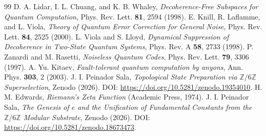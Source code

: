 \documentclass[aps,pra,twocolumn,10pt,superscriptaddress]{revtex4-2}
\newcommand{\Zmod}{\mathbb{Z}/6\mathbb{Z}}
\begin{document}
\begin{thebibliography}{99}
 D. A. Lidar, I. L. Chuang, and K. B. Whaley, \textit{Decoherence-Free Subspaces for Quantum Computation}, Phys. Rev. Lett. \textbf{81}, 2594 (1998).
 E. Knill, R. Laflamme, and L. Viola, \textit{Theory of Quantum Error Correction for General Noise}, Phys. Rev. Lett. \textbf{84}, 2525 (2000).
 L. Viola and S. Lloyd, \textit{Dynamical Suppression of Decoherence in Two-State Quantum Systems}, Phys. Rev. A \textbf{58}, 2733 (1998).
 P. Zanardi and M. Rasetti, \textit{Noiseless Quantum Codes}, Phys. Rev. Lett. \textbf{79}, 3306 (1997).
 A. Yu. Kitaev, \textit{Fault-tolerant quantum computation by anyons}, Ann. Phys. \textbf{303}, 2 (2003).
 J. I. Peinador Sala, \textit{Topological State Preparation via $\Zmod$ Superselection}, Zenodo (2026). DOI: \url{https://doi.org/10.5281/zenodo.19354010}.
 H. M. Edwards, \textit{Riemann's Zeta Function} (Academic Press, 1974).
 J. I. Peinador Sala, \textit{The Genesis of $e$ and the Unification of Fundamental Constants from the $\Zmod$ Modular Substrate}, Zenodo (2026). DOI: \url{https://doi.org/10.5281/zenodo.18673473}.
\end{thebibliography}
\end{document}
